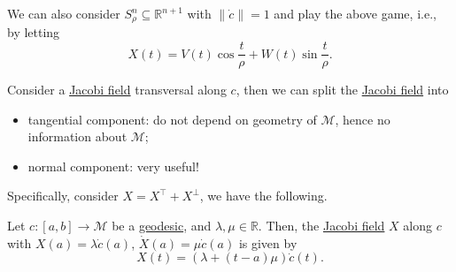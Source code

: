 \begin{remark}
	We can also consider \(S^n_{\rho } \subseteq \mathbb{R} ^{n+1}\) with \(\lVert \dot{c} \rVert = 1\) and play the above game, i.e., by letting
	\[
		X(t) = V(t) \cos \frac{t}{\rho } + W(t) \sin \frac{t}{\rho }.
	\]
\end{remark}

Consider a \hyperref[def:Jacobi-field]{Jacobi field} transversal along \(c\), then we can split the \hyperref[def:Jacobi-field]{Jacobi field} into
	\begin{itemize}
		\item tangential component: do not depend on geometry of \(\mathcal{M} \), hence no information about \(\mathcal{M} \);
		\item normal component: very useful!
	\end{itemize}
	Specifically, consider \(X = X^{\top} + X^{\perp} \), we have the following. 

\begin{lemma}
	Let \(c\colon [a, b] \to \mathcal{M} \) be a \hyperref[def:geodesic]{geodesic}, and \(\lambda , \mu \in \mathbb{R} \). Then, the \hyperref[def:Jacobi-field]{Jacobi field} \(X\) along \(c\) with \(X(a) = \lambda \dot{c} (a)\), \(\dot{X} (a) = \mu \dot{c} (a)\) is given by 
	\[
		X(t) = (\lambda + (t-a)\mu )\dot{c}(t). 
	\]
\end{lemma}
